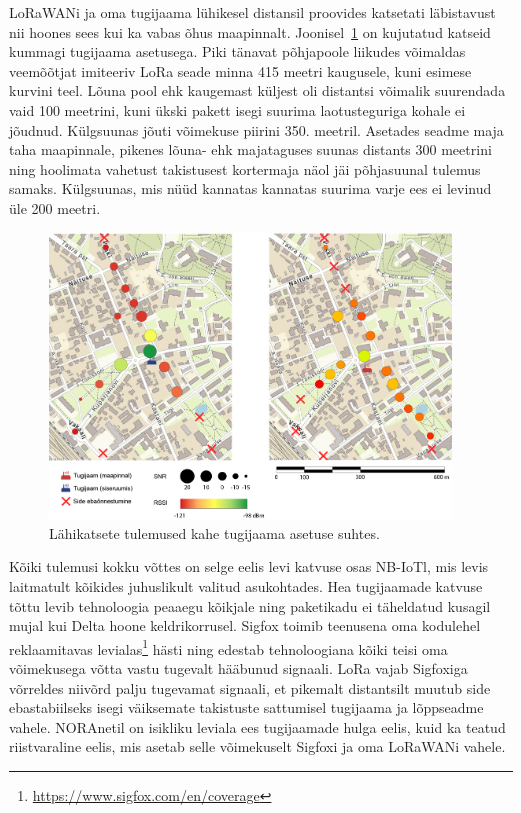 \documentclass[12pt]{article}
\begin{document}
    LoRaWANi ja oma tugijaama lühikesel distansil proovides katsetati läbistavust nii hoones sees kui ka vabas õhus maapinnalt.
    Joonisel~\ref{fig:lahikatsed} on kujutatud katseid kummagi tugijaama asetusega.
    Piki tänavat põhjapoole liikudes võimaldas veemõõtjat imiteeriv LoRa seade minna 415 meetri kaugusele, kuni esimese kurvini teel.
    Lõuna pool ehk kaugemast küljest oli distantsi võimalik suurendada vaid 100 meetrini, kuni ükski pakett isegi suurima laotusteguriga kohale ei jõudnud.
    Külgsuunas jõuti võimekuse piirini 350. meetril.
    Asetades seadme maja taha maapinnale, pikenes lõuna- ehk majataguses suunas distants 300 meetrini ning hoolimata vahetust takistusest kortermaja näol jäi põhjasuunal tulemus samaks.
    Külgsuunas, mis nüüd kannatas kannatas suurima varje ees ei levinud üle 200 meetri.

    \begin{figure} [ht]
        \begin{center}
            \includegraphics[width=0.95\textwidth]{figures/lahikatsed.png}
            \caption{Lähikatsete tulemused kahe tugijaama asetuse suhtes.}
            \label{fig:lahikatsed}
        \end{center}
    \end{figure}

    Kõiki tulemusi kokku võttes on selge eelis levi katvuse osas NB-IoTl, mis levis laitmatult kõikides juhuslikult valitud asukohtades.
    Hea tugijaamade katvuse tõttu levib tehnoloogia peaaegu kõikjale ning paketikadu ei täheldatud kusagil mujal kui Delta hoone keldrikorrusel.
    Sigfox toimib teenusena oma kodulehel reklaamitavas levialas\footnote{\url{https://www.sigfox.com/en/coverage}} hästi ning edestab tehnoloogiana kõiki teisi oma võimekusega võtta vastu tugevalt hääbunud signaali.
    LoRa vajab Sigfoxiga võrreldes niivõrd palju tugevamat signaali, et pikemalt distantsilt muutub side ebastabiilseks isegi väiksemate takistuste sattumisel tugijaama ja lõppseadme vahele.
    NORAnetil on isikliku leviala ees tugijaamade hulga eelis, kuid ka teatud riistvaraline eelis, mis asetab selle võimekuselt Sigfoxi ja oma LoRaWANi vahele.
\end{document}
